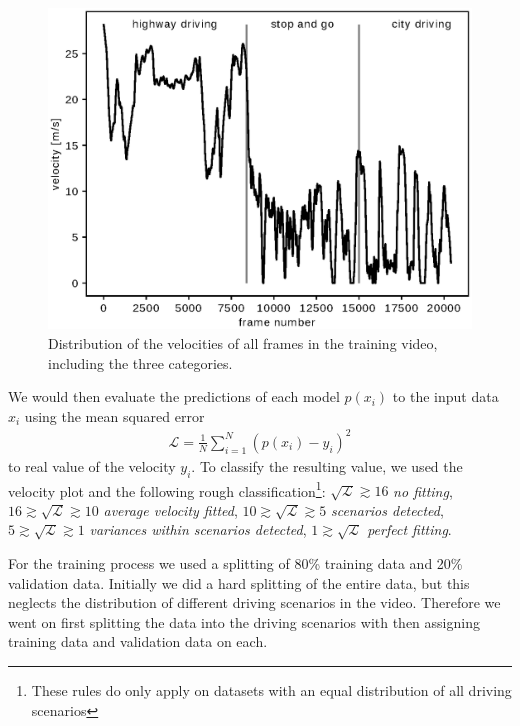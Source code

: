 \documentclass[conference]{IEEEtran}
\begin{document}
\begin{figure}[ht]
	\centering
	\includegraphics[scale=0.55]{./imgs/plot_speed_time_new_splitting.eps}
	\caption{Distribution of the velocities of all frames in the training video, including the three categories.}
	\label{fig:SpeedPerFrameDistributionNewSplitting}
\end{figure}

We would then evaluate the predictions of each model $p(x_i)$ to the input data $x_i$ using the mean squared error
\begin{align}
	\mathcal{L} = \frac{1}{N} \sum\limits_{i=1}^{N} (p(x_i) - y_i)^2
\end{align}
to real value of the velocity $y_i$. To classify the resulting value, we used the velocity plot and the 
following rough classification\footnote{These rules do only apply on datasets with an equal distribution 
of all driving scenarios}: $\sqrt{\mathcal{L}} \gtrsim 16$ \textit{no fitting}, $16 \gtrsim 
\sqrt{\mathcal{L}} \gtrsim 10$ \emph{average velocity fitted}, $10 \gtrsim \sqrt{\mathcal{L}} \gtrsim 5$
\emph{scenarios detected}, $5 \gtrsim \sqrt{\mathcal{L}} \gtrsim 1$ \emph{variances within scenarios 
detected}, $1 \gtrsim \sqrt{\mathcal{L}}$ \emph{perfect fitting}.

For the training process we used a splitting of 80\% training data and 20\% validation data. Initially 
we did a hard splitting of the entire data, but this neglects the distribution of different driving 
scenarios in the video. Therefore we went on first splitting the data into the driving scenarios with 
then assigning training data and validation data on each.
\end{document}

